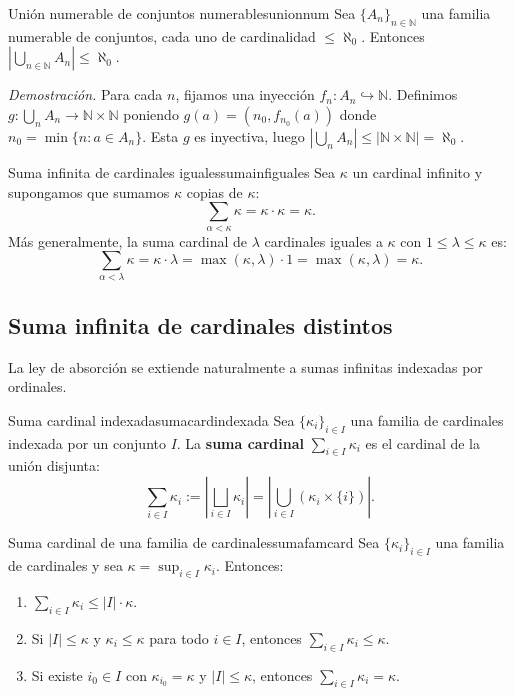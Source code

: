 \begin{ejemplo}{Unión numerable de conjuntos numerables}{unionnum}
Sea $\{A_n\}_{n \in \mathbb{N}}$ una familia numerable de conjuntos, cada uno de cardinalidad $\leq \aleph_0$. Entonces $\left|\bigcup_{n \in \mathbb{N}} A_n\right| \leq \aleph_0$.

\textit{Demostración.} Para cada $n$, fijamos una inyección $f_n \colon A_n \hookrightarrow \mathbb{N}$. Definimos $g \colon \bigcup_n A_n \to \mathbb{N} \times \mathbb{N}$ poniendo $g(a) = (n_0, f_{n_0}(a))$ donde $n_0 = \min\{n : a \in A_n\}$. Esta $g$ es inyectiva, luego $\left|\bigcup_n A_n\right| \leq |\mathbb{N} \times \mathbb{N}| = \aleph_0$.
\end{ejemplo}

\begin{ejemplo}{Suma infinita de cardinales iguales}{sumainfiguales}
Sea $\kappa$ un cardinal infinito y supongamos que sumamos $\kappa$ copias de $\kappa$:
\[
  \sum_{\alpha < \kappa} \kappa = \kappa \cdot \kappa = \kappa.
\]
Más generalmente, la suma cardinal de $\lambda$ cardinales iguales a $\kappa$ con $1 \leq \lambda \leq \kappa$ es:
\[
  \sum_{\alpha < \lambda} \kappa = \kappa \cdot \lambda = \max(\kappa, \lambda) \cdot 1 = \max(\kappa,\lambda) = \kappa.
\]
\end{ejemplo}

\subsection{Suma infinita de cardinales distintos}

La ley de absorción se extiende naturalmente a sumas infinitas indexadas por ordinales.

\begin{definicion}{Suma cardinal indexada}{sumacardindexada}
Sea $\{\kappa_i\}_{i \in I}$ una familia de cardinales indexada por un conjunto $I$. La \textbf{suma cardinal} $\sum_{i \in I} \kappa_i$ es el cardinal de la unión disjunta:
\[
  \sum_{i \in I} \kappa_i := \left|\bigsqcup_{i \in I} \kappa_i\right| = \left|\bigcup_{i \in I} (\kappa_i \times \{i\})\right|.
\]
\end{definicion}

\begin{proposicion}{Suma cardinal de una familia de cardinales}{sumafamcard}
Sea $\{\kappa_i\}_{i \in I}$ una familia de cardinales y sea $\kappa = \sup_{i \in I} \kappa_i$. Entonces:
\begin{enumerate}[leftmargin=2em, label=(\roman*)]
  \item $\sum_{i \in I} \kappa_i \leq |I| \cdot \kappa$.
  \item Si $|I| \leq \kappa$ y $\kappa_i \leq \kappa$ para todo $i \in I$, entonces $\sum_{i \in I} \kappa_i \leq \kappa$.
  \item Si existe $i_0 \in I$ con $\kappa_{i_0} = \kappa$ y $|I| \leq \kappa$, entonces $\sum_{i \in I} \kappa_i = \kappa$.
\end{enumerate}
\end{proposicion}

